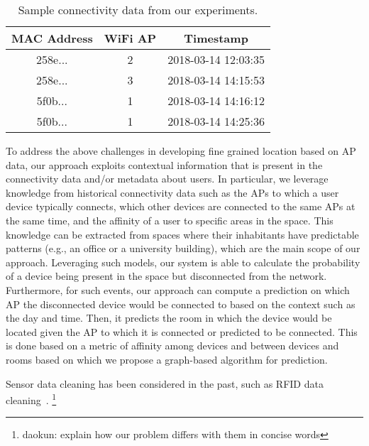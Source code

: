 \begin{table}[!htb]
	\centering
	\caption{Sample connectivity data from our experiments.}
	\label{tab:connectivity}
	\label{tab:wifi}
	\begin{tabular}{|c|c|c|}
		\hline
		MAC Address & WiFi AP & Timestamp \\ \hline
		258e... & 2 & 2018-03-14 12:03:35  \\ \hline
		258e... & 3 & 2018-03-14 14:15:53 \\ \hline
		5f0b... & 1 & 2018-03-14 14:16:12 \\ \hline
		5f0b... & 1 & 2018-03-14 14:25:36 \\ \hline
	\end{tabular}
	\vspace{-0.5em}
\end{table} 

To address the above challenges in developing fine grained location based on AP data, our approach exploits contextual information that is present in the connectivity data and/or metadata about users. In particular, we leverage knowledge from historical connectivity data such as the APs to which a user device typically connects, which other devices are connected to the same APs at the same time, and the affinity of a user to specific areas in the space. This knowledge can be extracted from spaces where their inhabitants have predictable patterns (e.g., an office or a university building), which are the main scope of our approach. Leveraging such models, our system is able to calculate the probability of a device being present in the space but disconnected from the network. Furthermore, for such events, our approach can compute a prediction on which AP the disconnected device would be connected to based on the context such as the day and time. Then, it predicts the room in which the device would be located given the AP to which it is connected or predicted to be connected. This is done based on a metric of affinity among devices and between devices and rooms based on which we propose a graph-based algorithm for prediction. 

Sensor data cleaning has been considered in the past, such as RFID data cleaning~\cite{jeffery2006adaptive,baba2016learning}. \footnote{daokun: explain how our problem differs with them in concise words}



